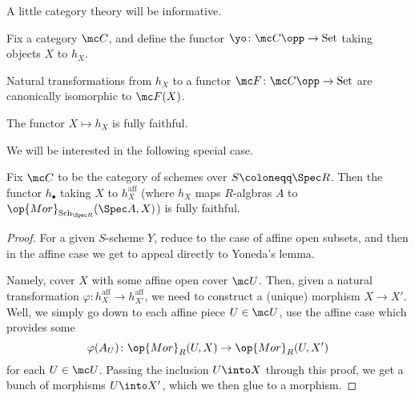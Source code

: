 \documentclass[../notes.tex]{subfiles}
\begin{document}
A little category theory will be informative.
\begin{thm} \label{thm:yo-lem}
	Fix a category $\mc C$, and define the functor $\yo\colon\mc C\opp\to\mathrm{Set}$ taking objects $X$ to $h_X$.
	\begin{listalph}
		\item Natural transformations from $h_X$ to a functor $\mc F\colon\mc C\opp\to\mathrm{Set}$ are canonically isomorphic to $\mc F(X)$.
		\item The functor $X\mapsto h_X$ is fully faithful.
	\end{listalph}
\end{thm}
We will be interested in the following special case.
\begin{corollary}
	Fix $\mc C$ to be the category of schemes over $S\coloneqq\Spec R$. Then the functor $h_\bullet$ taking $X$ to $h_X^{\mathrm{aff}}$ (where $h_X$ maps $R$-algbras $A$ to $\op{Mor}_{\mathrm{Sch}_{\Spec R}}(\Spec A,X)$) is fully faithful.
\end{corollary}
\begin{proof}
	For a given $S$-scheme $Y$, reduce to the case of affine open subsets, and then in the affine case we get to appeal directly to Yoneda's lemma.

	Namely, cover $X$ with some affine open cover $\mc U$. Then, given a natural transformation $\varphi\colon h_X^{\mathrm{aff}}\to h_{X'}^{\mathrm{aff}}$, we need to construct a (unique) morphism $X\to X'$. Well, we simply go down to each affine piece $U\in\mc U$, use the affine case which provides some
	\[\varphi(A_U)\colon\op{Mor}_R(U,X)\to\op{Mor}_R(U,X')\]
	for each $U\in\mc U$. Passing the inclusion $U\into X$ through this proof, we get a bunch of morphisms $U\into X'$, which we then glue to a morphism.
\end{proof}
\end{document}

